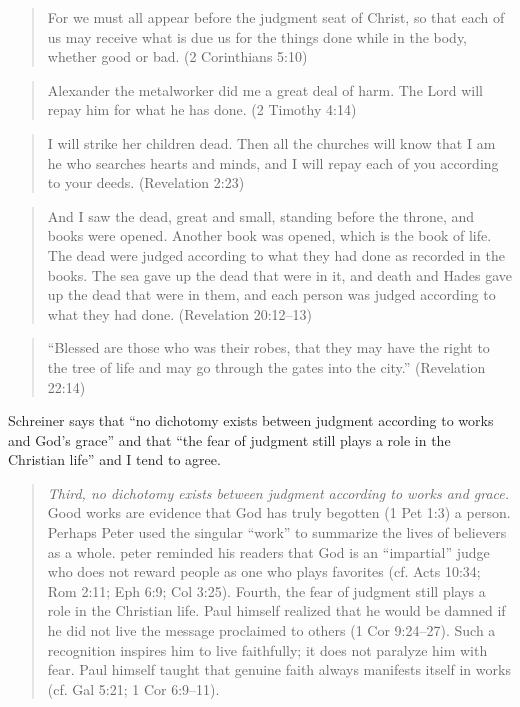 \begin{quote}
    For we must all appear before the judgment seat of Christ, so that each of
    us may receive what is due us for the things done while in the body, whether
    good or bad. (2 Corinthians 5:10)
\end{quote}

\begin{quote}
    Alexander the metalworker did me a great deal of harm. The Lord will repay
    him for what he has done. (2 Timothy 4:14)
\end{quote}

\begin{quote}
    I will strike her children dead. Then all the churches will know that I am
    he who searches hearts and minds, and I will repay each of you according to
    your deeds. (Revelation 2:23)
\end{quote}

\begin{quote}
    And I saw the dead, great and small, standing before the throne, and books
    were opened. Another book was opened, which is the book of life. The dead
    were judged according to what they had done as recorded in the books. The
    sea gave up the dead that were in it, and death and Hades gave up the dead
    that were in them, and each person was judged according to what they had
    done. (Revelation 20:12--13)
\end{quote}

\begin{quote}
    \enquote{Blessed are those who was their robes, that they may have the right
    to the tree of life and may go through the gates into the city.} (Revelation
    22:14)
\end{quote}

Schreiner says that \enquote{no dichotomy exists between judgment according to
works and God's grace} and that \enquote{the fear of judgment still plays a role
in the Christian life} and I tend to agree.

\begin{quote}
    \emph{Third, no dichotomy exists between judgment according to works and
    grace.} Good works are evidence that God has truly begotten (1 Pet 1:3) a
    person. Perhaps Peter used the singular \enquote{work} to summarize the
    lives of believers as a whole. peter reminded his readers that God is an
    \enquote{impartial} judge who does not reward people as one who plays
    favorites (cf. Acts 10:34; Rom 2:11; Eph 6:9; Col 3:25). Fourth, the fear of
    judgment still plays a role in the Christian life. Paul himself realized
    that he would be damned if he did not live the message proclaimed to others
    (1 Cor 9:24--27). Such a recognition inspires him to live faithfully; it
    does not paralyze him with fear. Paul himself taught that genuine faith
    always manifests itself in works (cf. Gal 5:21; 1 Cor 6:9--11).
    \autocite[83]{schreiner:2003}
\end{quote}

